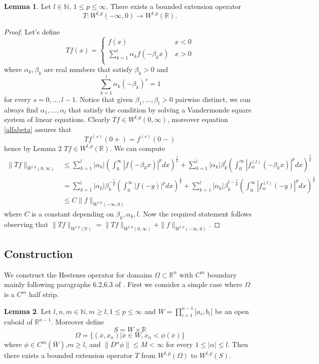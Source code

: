 \documentclass[12pt]{article}
\theoremstyle{definition}
\newtheorem{lemma}{Lemma}
\begin{document}
\begin{lemma}
Let $l \in \mathbb{N}$, $1\le p\le \infty.$ There exists a bounded extension operator 
\[ T : W^{l,p}(-\infty,0) \rightarrow W^{l,p}(\mathbb{R}). \]
\end{lemma}
\begin{proof}
Let's define 
\[   Tf(x) = \begin{cases}
				f(x) &  x<0 \\
				\sum_{k=1}^l \alpha_kf(-\beta_k x)  &   x>0 \\
	        \end{cases}
\]
where $\alpha_k,\beta_k$ are real numbers that satisfy $\beta_k>0$ and
\begin{equation}\label{alfabeta}
 \sum_{k=1}^l \alpha_k (-\beta_k)^s=1  
\end{equation}
for every $s=0,...,l-1$.  Notice that given $\beta_1,...,\beta_l>0$  pairwise distinct, we can always find $\alpha_1,...,\alpha_l$ that satisfy the condition by solving a Vandermonde square system of linear equations. Clearly $Tf\in W^{l,p}(0,\infty)$, moreover equation \eqref{alfabeta} assures that
\[ Tf^{(s)}(0+)=f^{(s)}(0-)\]
hence by Lemma 2  $Tf \in W^{l,p}(\mathbb{R})$. We can compute
\begin{align*}
 \|Tf\|_{W^{l,p}(0,\infty)} &\le \sum_{k=1}^l |\alpha_k|  \left( \int_0^\infty  |f(-\beta_k x)|^p dx\right ) ^\frac{1}{p} + \sum_{k=1}^l |\alpha_k| \beta_k^{l} \left( \int_0^\infty  |f^{(l)}_w(-\beta_k x)|^p dx\right ) ^\frac{1}{p} \\
  &=\sum_{k=1}^l |\alpha_k| \beta_k^{-\frac{1}{p}} \left( \int_0^\infty  |f(-y)|^p dx\right ) ^\frac{1}{p} +\sum_{k=1}^l |\alpha_k| \beta_k^{l-\frac{1}{p}} \left( \int_0^\infty  |f^{(l)}_w(-y)|^p dx\right ) ^\frac{1}{p} \\
  &\le C\|f\|_{W^{l,p}(-\infty,0)} 
\end{align*}
where $C$ is a constant depending on $\beta_k,\alpha_k,l$. Now the required statement follows observing that $\|Tf\|_{W^{l,p}(\mathbb{R})}=\|Tf\|_{W^{l,p}(0,\infty)}+\|f\|_{W^{l,p}(-\infty,0)} $.
\end{proof}

\fi 

\subsection{Construction}
We construct the Hestenes operator for domains  $\Omega \subset \mathbb{R}^n$ with $C^m$ boundary mainly following paragraphs 6.2,6.3 of \cite{burenkov}. First we consider a simple case where $\Omega$ is a $C^m$ half strip.
\begin{lemma}\label{hestenes1}
Let $l,n,m \in \mathbb{N}, m\ge l, 1\le p \le \infty$ and $W = \prod\limits_{i=1}^{n-1}]a_i,b_i[$ be an open cuboid of $\mathbb{R}^{n-1}$. Moreover define
\[ S=W \times \mathbb{R} \]
\[\Omega =\{ (\overline x,x_n) | \overline x\in W, x_n<\phi(\overline x)  \} \]
where $\phi \in C^m(\overline W)$,$m\ge l$, and $\| D^{\alpha}\phi \|\le M <\infty $ for every $1\le|\alpha|\le l$. Then there exists a bounded extension operator $T$ from $W^{l,p}(\Omega)$ to $W^{l,p}(S).$
\end{lemma}
\end{document}
